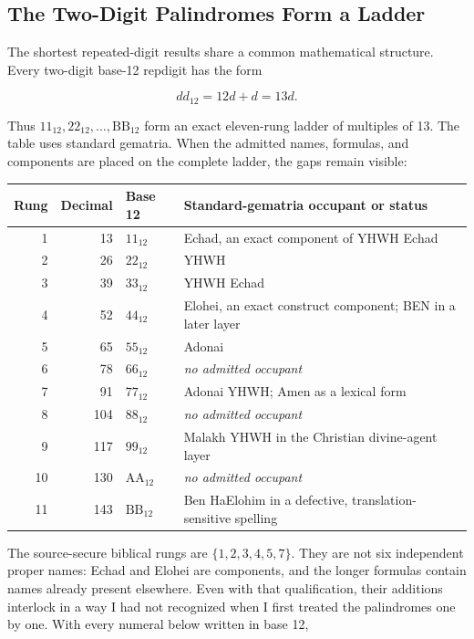 \subsection{The Two-Digit Palindromes Form a Ladder}

The shortest repeated-digit results share a common mathematical structure. Every two-digit base-12 repdigit has the form

\[
dd_{12}=12d+d=13d.
\]

Thus $11_{12},22_{12},\ldots,\mathrm{BB}_{12}$ form an exact eleven-rung ladder of multiples of 13. The table uses standard gematria. When the admitted names, formulas, and components are placed on the complete ladder, the gaps remain visible:

\begin{center}
\small
\begin{tabular}{rrl>{\raggedright\arraybackslash}p{7.0cm}}
\toprule
Rung & Decimal & Base 12 & Standard-gematria occupant or status \\
\midrule
1 & 13 & $11_{12}$ & Echad, an exact component of YHWH Echad \\
2 & 26 & $22_{12}$ & YHWH \\
3 & 39 & $33_{12}$ & YHWH Echad \\
4 & 52 & $44_{12}$ & Elohei, an exact construct component; BEN in a later layer \\
5 & 65 & $55_{12}$ & Adonai \\
6 & 78 & $66_{12}$ & \emph{no admitted occupant} \\
7 & 91 & $77_{12}$ & Adonai YHWH; Amen as a lexical form \\
8 & 104 & $88_{12}$ & \emph{no admitted occupant} \\
9 & 117 & $99_{12}$ & Malakh YHWH in the Christian divine-agent layer \\
10 & 130 & $\mathrm{AA}_{12}$ & \emph{no admitted occupant} \\
11 & 143 & $\mathrm{BB}_{12}$ & Ben HaElohim in a defective, translation-sensitive spelling \\
\bottomrule
\end{tabular}
\end{center}

The source-secure biblical rungs are $\{1,2,3,4,5,7\}$. They are not six independent proper names: Echad and Elohei are components, and the longer formulas contain names already present elsewhere. Even with that qualification, their additions interlock in a way I had not recognized when I first treated the palindromes one by one. With every numeral below written in base 12,

